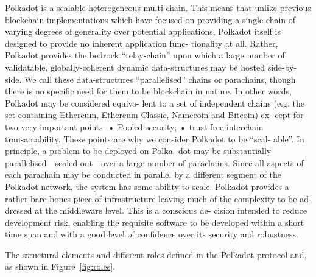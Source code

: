 Polkadot is a scalable heterogeneous multi-chain. This means that unlike previous blockchain implementations which have focused on providing a single chain of varying degrees of generality over potential applications, Polkadot itself is designed to provide no inherent application func- tionality at all. Rather, Polkadot provides the bedrock “relay-chain” upon which a large number of validatable, globally-coherent dynamic data-structures may be hosted side-by-side.
We call these data-structures “parallelised” chains or parachains, though there is no specific need for them to be blockchain in nature.
In other words, Polkadot may be considered equiva- lent to a set of independent chains (e.g. the set containing Ethereum, Ethereum Classic, Namecoin and Bitcoin) ex- cept for two very important points:
• Pooled security;
• trust-free interchain transactability.
These points are why we consider Polkadot to be “scal- able”. In principle, a problem to be deployed on Polka- dot may be substantially parallelised—scaled out—over a large number of parachains. Since all aspects of each parachain may be conducted in parallel by a different segment of the Polkadot network, the system has some ability to scale. Polkadot provides a rather bare-bones piece of infrastructure leaving much of the complexity to be ad- dressed at the middleware level. This is a conscious de- cision intended to reduce development risk, enabling the requisite software to be developed within a short time span and with a good level of confidence over its security and robustness.

The structural elements and different roles defined in the Polkadot protocol and, as shown in Figure~\ref{fig:roles}.





